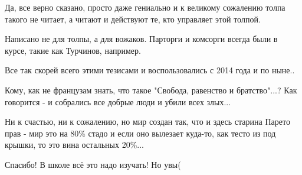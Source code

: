 \begin{itemize}
 
Да, все верно сказано, просто даже гениально и к великому сожалению толпа такого
не читает, а читают и действуют те, кто управляет этой толпой.

 
Написано не для толпы, а для вожаков. Парторги и комсорги всегда были в курсе, такие как Турчинов, например.

 
Все так скорей всего этими тезисами и воспользовались с 2014 года и по ныне..

 

Кому, как не французам знать, что такое "Свобода, равенство и братство"...? Как
говорится - и собрались все добрые люди и убили всех злых...

Ни к счастью, ни к сожалению, но мир создан так, что и здесь старина Парето
прав - мир это на 80\% стадо и если оно вылезает куда-то, как тесто из под
крышки, то это вина остальных 20\%...

 
Спасибо! В школе всё это надо изучать! Но увы(

\begin{itemize}
 

\end{itemize}
\end{itemize}
